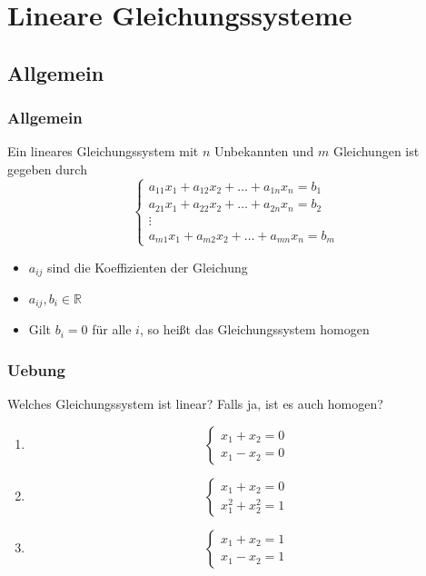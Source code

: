\section{Lineare Gleichungssysteme}
\subsection{Allgemein}
\begin{frame}
    \frametitle{Allgemein}
    Ein lineares Gleichungssystem mit $n$ Unbekannten und $m$ Gleichungen ist gegeben durch
    \begin{equation*}
        \begin{cases}
            a_{11}x_1 + a_{12}x_2 + \dots + a_{1n}x_n = b_1 \\
            a_{21}x_1 + a_{22}x_2 + \dots + a_{2n}x_n = b_2 \\
            \vdots \\
            a_{m1}x_1 + a_{m2}x_2 + \dots + a_{mn}x_n = b_m
        \end{cases}
    \end{equation*}
    \begin{itemize}
        \item $a_{ij}$ sind die Koeffizienten der Gleichung
        \item $a_{ij},  b_i \in \mathbb{R}$
        \item Gilt $b_i = 0$ für alle $i$, so heißt das Gleichungssystem homogen
    \end{itemize}
\end{frame}

\begin{frame}
    \frametitle{Uebung}
    Welches Gleichungssystem ist linear?
    Falls ja, ist es auch homogen?
    \begin{enumerate}
        \item
        \begin{equation*}
            \begin{cases}
                x_1 + x_2 = 0 \\
                x_1 - x_2 = 0
            \end{cases}
        \end{equation*}
        \item
        \begin{equation*}
            \begin{cases}
                x_1 + x_2 = 0 \\
                x_1^2 + x_2^2 = 1
            \end{cases}
        \end{equation*}
        \item
        \begin{equation*}
            \begin{cases}
                x_1 + x_2 = 1 \\
                x_1 - x_2 = 1
            \end{cases}
        \end{equation*}
    \end{enumerate}
\end{frame}

